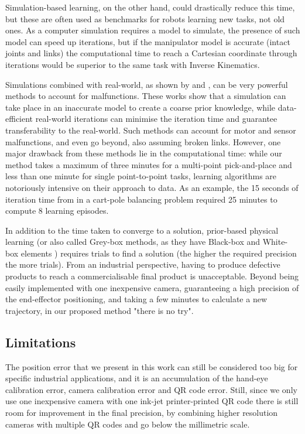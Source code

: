 \documentclass{ieeeaccess}
\begin{document}
Simulation-based learning, on the other hand, could drastically reduce this time, but these are often used as benchmarks for robots learning new tasks, not old ones. As a computer simulation requires a model to simulate, the presence of such model can speed up iterations, but if the manipulator model is accurate (intact joints and links) the computational time to reach a Cartesian coordinate through iterations would be superior to the same task with Inverse Kinematics.

Simulations combined with real-world, as shown by \cite{cully2015robots} and \cite{chatzilygeroudis2017black}, can be very powerful methods to account for malfunctions. These works show that a simulation can take place in an inaccurate model to create a coarse prior knowledge, while data-efficient real-world iterations can minimise the iteration time and guarantee transferability to the real-world. Such methods can account for motor and sensor malfunctions, and even go beyond, also assuming broken links. However, one major drawback from these methods lie in the computational time: while our method takes a maximum of three minutes for a multi-point pick-and-place and less than one minute for single point-to-point tasks, learning algorithms are notoriously intensive on their approach to data. As an example, the 15 seconds of iteration time from \cite{chatzilygeroudis2017black} in a cart-pole balancing problem required 25 minutes to compute 8 learning episodes.

In addition to the time taken to converge to a solution, prior-based physical learning (or also called Grey-box methods, as they have Black-box and White-box elements \cite{kroll2000grey}) requires trials to find a solution (the higher the required precision the more trials). From an industrial perspective, having to produce defective products to reach a commercialisable final product is unacceptable. Beyond being easily implemented with one inexpensive camera, guaranteeing a high precision of the end-effector positioning, and taking a few minutes to calculate a new trajectory, in our proposed method "there is no try".

\subsection{Limitations}

The position error that we present in this work can still be considered too big for specific industrial applications, and it is an accumulation of the hand-eye calibration error, camera calibration error and QR code error. Still, since we only use one inexpensive camera with one ink-jet printer-printed QR code there is still room for improvement in the final precision, by combining higher resolution cameras with multiple QR codes and go below the millimetric scale. 
\end{document}
